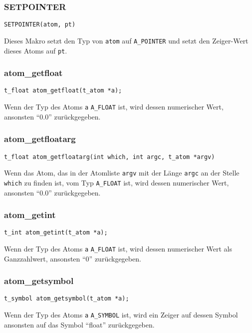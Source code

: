 \documentclass[12pt, a4paper,austrian, titlepage]{article}
\begin{document}
\begin{appendix}
\subsubsection{SETPOINTER}
\begin{verbatim}
SETPOINTER(atom, pt)
\end{verbatim}
Dieses Makro setzt den Typ von \verb+atom+ auf \verb+A_POINTER+
und setzt den Zeiger-Wert dieses Atoms auf \verb+pt+.

\subsubsection{atom\_getfloat}
\begin{verbatim}
t_float atom_getfloat(t_atom *a);
\end{verbatim}
Wenn der Typ des Atoms \verb+a+ \verb+A_FLOAT+ ist, wird dessen numerischer Wert,
ansonsten ``0.0'' zurückgegeben.

\subsubsection{atom\_getfloatarg}
\begin{verbatim}
t_float atom_getfloatarg(int which, int argc, t_atom *argv)
\end{verbatim}
Wenn das Atom,
das in der Atomliste \verb+argv+ mit der Länge \verb+argc+ an der Stelle \verb+which+
zu finden ist,
vom Typ \verb+A_FLOAT+ ist, wird dessen numerischer Wert,
ansonsten ``0.0'' zurückgegeben.

\subsubsection{atom\_getint}
\begin{verbatim}
t_int atom_getint(t_atom *a);
\end{verbatim}
Wenn der Typ des Atoms \verb+a+ \verb+A_FLOAT+ ist, wird dessen numerischer
Wert als Ganzzahlwert, ansonsten ``0'' zurückgegeben.

\subsubsection{atom\_getsymbol}
\begin{verbatim}
t_symbol atom_getsymbol(t_atom *a);
\end{verbatim}
Wenn der Typ des Atoms \verb+a+ \verb+A_SYMBOL+ ist, wird ein Zeiger
auf dessen Symbol ansonsten auf das Symbol ``float'' zurückgegeben.


\end{appendix}
\end{document}
